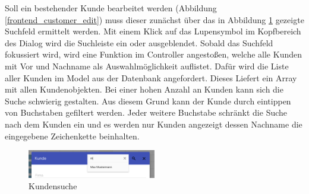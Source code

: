 Soll ein bestehender Kunde bearbeitet werden (Abbildung \ref{frontend_customer_edit}) muss dieser zunächst über das in Abbildung \ref{frontend_customer_search}
gezeigte Suchfeld ermittelt werden. Mit einem Klick auf das Lupensymbol im Kopfbereich des Dialog wird die Suchleiste ein oder ausgeblendet. Sobald das Suchfeld
fokussiert wird, wird eine Funktion im Controller angestoßen, welche alle Kunden mit Vor und Nachname als Auswahlmöglichkeit auflistet. Dafür wird die Liste aller
Kunden im Model aus der Datenbank angefordert. Dieses Liefert ein Array mit allen Kundenobjekten. Bei einer hohen Anzahl an Kunden kann sich die Suche schwierig
gestalten. Aus diesem Grund kann der Kunde durch eintippen von Buchstaben gefiltert werden. Jeder weitere Buchstabe schränkt die Suche nach dem Kunden ein und es
werden nur Kunden angezeigt dessen Nachname die eingegebene Zeichenkette beinhalten.

\begin{figure}[H]
\centering\includegraphics[width=0.5\textwidth]{images/frontend_customer_search.png}
\caption{Kundensuche}
\label{frontend_customer_search}
\end{figure}


